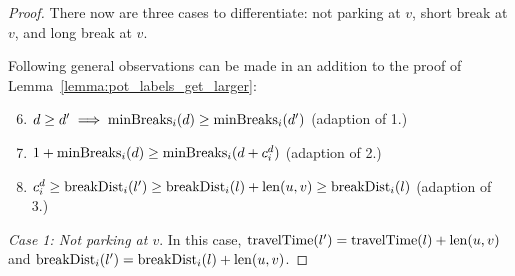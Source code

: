 \begin{proof}
	There now are three cases to differentiate: not parking at $v$, short break at $v$, and long break at $v$.

	Following general observations can be made in an addition to the proof of Lemma~\ref{lemma:pot_labels_get_larger}:

	\begin{enumerate}
		\setcounter{enumi}{5}
		\item $d \ge d' \implies \operatorname{minBreaks}_i(d) \ge \operatorname{minBreaks}_i(d')$ (adaption of 1.)
		\item $1 + \operatorname{minBreaks}_i(d) \ge \operatorname{minBreaks}_i(d + c_i^d)$ (adaption of 2.)
		\item $c_i^d \ge \operatorname{breakDist}_i(l') \ge \operatorname{breakDist}_i(l) + \operatorname{len}(u,v) \ge \operatorname{breakDist}_i(l)$ (adaption of 3.)
	\end{enumerate}

	\emph{Case 1: Not parking at $v$}. In this case, $\operatorname{travelTime}(l') = \operatorname{travelTime}(l) + \operatorname{len}(u,v)$ and $\operatorname{breakDist}_i(l') = \operatorname{breakDist}_i(l) + \operatorname{len}(u,v)$.


\end{proof}
